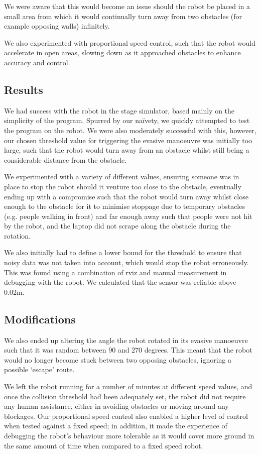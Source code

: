 \documentclass[twocolumn,11pt]{article}
\begin{document}
We were aware that this would become an issue should the robot be placed in a small area from which it would continually turn away from two obstacles (for example opposing walls) infinitely.

We also experimented with proportional speed control, such that the robot would accelerate in open areas, slowing down as it approached obstacles to enhance accuracy and control.

\subsection{Results}

We had success with the robot in the \textsf{stage} simulator, based mainly on the simplicity of the program. Spurred by our naïvety, we quickly attempted to test the program on the robot. We were also moderately successful with this, however, our chosen threshold value for triggering the evasive manoeuvre was initially too large, such that the robot would turn away from an obstacle whilst still being a considerable distance from the obstacle. 

We experimented with a variety of different values, ensuring someone was in place to stop the robot should it venture too close to the obstacle, eventually ending up with a compromise such that the robot would turn away whilst close enough to the obstacle for it to minimise stoppage due to temporary obstacles (e.g. people walking in front) and far enough away such that people were not hit by the robot, and the laptop did not scrape along the obstacle during the rotation. 

We also initially had to define a lower bound for the threshold to ensure that noisy data was not taken into account, which would stop the robot erroneously. This was found using a combination of \textsf{rviz} and manual measurement in debugging with the robot. We calculated that the sensor was reliable above 0.02m.

\subsection{Modifications}
We also ended up altering the angle the robot rotated in its evasive manoeuvre such that it was random between 90 and 270 degrees. This meant that the robot would no longer become stuck between two opposing obstacles, ignoring a possible `escape' route.

We left the robot running for a number of minutes at different speed values, and once the collision threshold had been adequately set, the robot did not require any human assistance, either in avoiding obstacles or moving around any blockages. Our proportional speed control also enabled a higher level of control when tested against a fixed speed; in addition, it made the experience of debugging the robot's behaviour more tolerable as it would cover more ground in the same amount of time when compared to a fixed speed robot.
\end{document}

